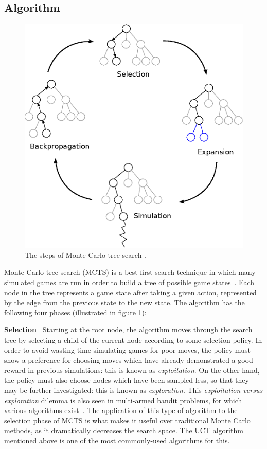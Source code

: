 \subsection{Algorithm}

\begin{figure}
\includegraphics[width=\linewidth]{diagrams/mcts}
\caption[The steps of Monte Carlo tree search]{The steps of Monte Carlo tree search \cite{Chaslot2008}. }
\label{fig:MCTS}
\end{figure}

Monte Carlo tree search (MCTS) is a best-first search technique in which many simulated games are run in order to build a tree of possible game states~\citep{Chaslot2008}.  Each node in the tree represents a game state after taking a given action, represented by the edge from the previous state to the new state.  The algorithm has the following four phases (illustrated in figure \ref{fig:MCTS}):

\textbf{Selection} ~Starting at the root node, the algorithm moves through the search tree by selecting a child of the current node according to some selection policy.  In order to avoid wasting time simulating games for poor moves, the policy must show a preference for choosing moves which have already demonstrated a good reward in previous simulations: this is known as \emph{exploitation}.  On the other hand, the policy must also choose nodes which have been sampled less, so that they may be further investigated: this is known as \emph{exploration}.  This \emph{exploitation versus exploration} dilemma is also seen in multi-armed bandit problems, for which various algorithms exist~\citep{Auer2002}.  The application of this type of algorithm to the selection phase of MCTS is what makes it useful over traditional Monte Carlo methods, as it dramatically decreases the search space.  The UCT algorithm~\citep{Kocsis2006} mentioned above is one of the most commonly-used algorithms for this.

